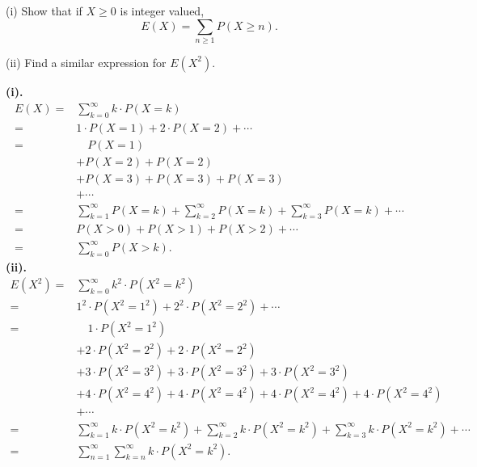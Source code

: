 \documentclass[en, normal, 11pt, black]{elegantnote}
\newenvironment{exercise}[1]{\begin{tcolorbox}[colback=black!15, colframe=black!80, breakable, title=#1]}{\end{tcolorbox}}
\renewenvironment{proof}{\begin{tcolorbox}[colback=white, colframe=black!50, breakable, title=Proof. ]\setlength{\parskip}{0.8em}}{\,\\\rightline{$\square$}\end{tcolorbox}}
\begin{document}
    \begin{exercise}{2.2.6}
        (i) Show that if $X \geqslant 0$ is integer valued, 
        \[
            E(X)=\sum_{n \geqslant 1} P(X \geqslant n). 
        \]
        
        (ii) Find a similar expression for $E (X^{2})$. 
    \end{exercise}

    \begin{proof}
        \bfseries{(i). }
        \[
            \begin{aligned}
                E(X)=&\sum_{k=0}^\infty k\cdot P(X=k)\\
                =&1\cdot P(X=1)+2\cdot P(X=2)+\cdots\\
                =&\quad P(X=1)\\
                &+P(X=2)+P(X=2)\\
                &+P(X=3)+P(X=3)+P(X=3)\\
                &+\cdots\\
                =&\sum_{k=1}^\infty P(X=k)+\sum_{k=2}^\infty P(X=k)+\sum_{k=3}^\infty P(X=k)+\cdots\\
                =&P(X>0)+P(X>1)+P(X>2)+\cdots\\
                =&\sum_{k=0}^\infty P(X>k). 
            \end{aligned}
        \]
        \bfseries{(ii). }
        \[
            \begin{aligned}
                E(X^2)=&\sum_{k=0}^\infty k^2\cdot P(X^2=k^2)\\
                =&1^2\cdot P(X^2=1^2)+2^2\cdot P(X^2=2^2)+\cdots\\
                =&\quad1\cdot P(X^2=1^2)\\
                &+2\cdot P(X^2=2^2)+2\cdot P(X^2=2^2)\\
                &+3\cdot P(X^2=3^2)+3\cdot P(X^2=3^2)+3\cdot P(X^2=3^2)\\
                &+4\cdot P(X^2=4^2)+4\cdot P(X^2=4^2)+4\cdot P(X^2=4^2)+4\cdot P(X^2=4^2)\\
                &+\cdots\\
                =&\sum_{k=1}^\infty k\cdot P(X^2=k^2)+\sum_{k=2}^\infty k\cdot P(X^2=k^2)+\sum_{k=3}^\infty k\cdot P(X^2=k^2)+\cdots\\
                =&\sum_{n=1}^\infty\sum_{k=n}^\infty k\cdot P(X^2=k^2). 
            \end{aligned}
        \]
    \end{proof}
\end{document}
